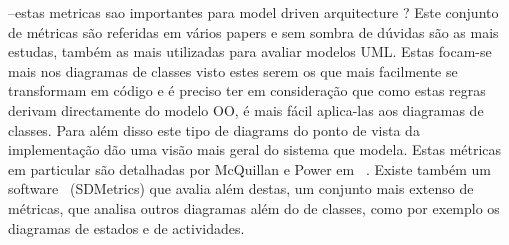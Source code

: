 --estas metricas sao importantes para model driven arquitecture ?
Este conjunto de métricas são referidas em vários papers e sem sombra de dúvidas são as mais estudas, também as mais utilizadas para avaliar modelos UML.
Estas focam-se mais nos diagramas de classes visto estes serem os que mais facilmente se transformam em código e é preciso ter
em consideração que como estas regras derivam directamente do modelo OO, é mais fácil aplica-las
aos diagramas de classes. Para além disso este tipo de diagrams do ponto de vista da implementação dão uma visão mais geral do sistema que modela.
Estas métricas em particular são detalhadas por McQuillan e Power em ~\cite{Power}. Existe também um software ~\cite{SDMetrics}(SDMetrics) que avalia além destas, um conjunto mais extenso de métricas, que analisa outros diagramas além do de classes, como por exemplo os diagramas de estados e de actividades.

